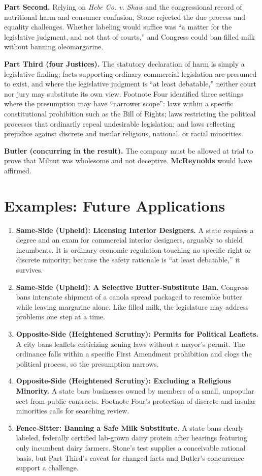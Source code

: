 \documentclass[12pt]{article}
\begin{document}
\textbf{Part Second.} Relying on \textit{Hebe Co. v. Shaw} and the congressional record of nutritional harm and consumer confusion, Stone rejected the due process and equality challenges. Whether labeling would suffice was ``a matter for the legislative judgment, and not that of courts,'' and Congress could ban filled milk without banning oleomargarine.

\textbf{Part Third (four Justices).} The statutory declaration of harm is simply a legislative finding; facts supporting ordinary commercial legislation are presumed to exist, and where the legislative judgment is ``at least debatable,'' neither court nor jury may substitute its own view. Footnote Four identified three settings where the presumption may have ``narrower scope'': laws within a specific constitutional prohibition such as the Bill of Rights; laws restricting the political processes that ordinarily repeal undesirable legislation; and laws reflecting prejudice against discrete and insular religious, national, or racial minorities.

\textbf{Butler (concurring in the result).} The company must be allowed at trial to prove that Milnut was wholesome and not deceptive. \textbf{McReynolds} would have affirmed.

\section{Examples: Future Applications}

\begin{enumerate}
\item \textbf{Same-Side (Upheld): Licensing Interior Designers.} A state requires a degree and an exam for commercial interior designers, arguably to shield incumbents. It is ordinary economic regulation touching no specific right or discrete minority; because the safety rationale is ``at least debatable,'' it survives.
\item \textbf{Same-Side (Upheld): A Selective Butter-Substitute Ban.} Congress bans interstate shipment of a canola spread packaged to resemble butter while leaving margarine alone. Like filled milk, the legislature may address problems one step at a time.
\item \textbf{Opposite-Side (Heightened Scrutiny): Permits for Political Leaflets.} A city bans leaflets criticizing zoning laws without a mayor's permit. The ordinance falls within a specific First Amendment prohibition and clogs the political process, so the presumption narrows.
\item \textbf{Opposite-Side (Heightened Scrutiny): Excluding a Religious Minority.} A state bars businesses owned by members of a small, unpopular sect from public contracts. Footnote Four's protection of discrete and insular minorities calls for searching review.
\item \textbf{Fence-Sitter: Banning a Safe Milk Substitute.} A state bans clearly labeled, federally certified lab-grown dairy protein after hearings featuring only incumbent dairy farmers. Stone's test supplies a conceivable rational basis, but Part Third's caveat for changed facts and Butler's concurrence support a challenge.
\end{enumerate}
\end{document}
